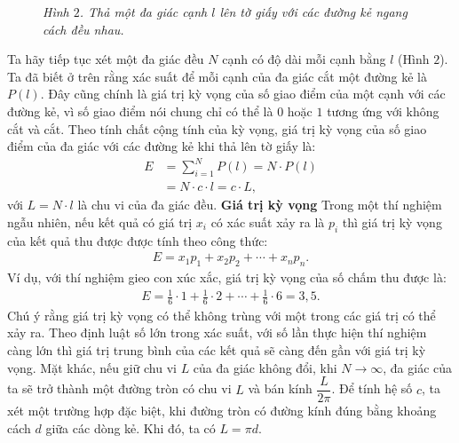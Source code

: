 \begin{multicols}{2}
\begin{figure}[H]
		\caption{\small\textit{\color{toanhocdoisong}Hình $2$. Thả một đa giác cạnh $l$ lên tờ giấy với các đường kẻ ngang cách đều nhau.}}
		\vspace*{-10pt}
	\end{figure}
	Ta hãy tiếp tục xét một đa giác đều $N$ cạnh có độ dài mỗi cạnh bằng $l$ (Hình $2$). Ta đã biết ở trên rằng xác suất để mỗi cạnh của đa giác cắt một đường kẻ là $P(l)$. Đây cũng chính là giá trị kỳ vọng của số giao điểm của một cạnh với các đường kẻ, vì số giao điểm nói chung chỉ có thể là $0$ hoặc $1$ tương ứng với không cắt và cắt. Theo tính chất cộng tính của kỳ vọng, giá trị kỳ vọng của số giao điểm của đa giác với các đường kẻ khi thả lên tờ giấy là:
	\begin{align*}
		E &= \sum\nolimits_{i = 1}^N {P(l) = N \cdot } P(l) \\
		&= N \cdot c \cdot l = c \cdot L, \tag{$1$}
	\end{align*}
	với $L=N \cdot l$ là chu vi của đa giác đều.
	\vskip 0.1cm
	\columnbreak
	\textbf{\color{toanhocdoisong}Giá trị kỳ vọng}
	\vskip 0.1cm
	Trong một thí nghiệm ngẫu nhiên, nếu kết quả có giá trị $x_i$ có xác suất xảy ra là $p_i$ thì giá trị kỳ vọng của kết quả thu được được tính theo công thức:
	\begin{align*}
		E=x_1 p_1+x_2 p_2+ \cdots +x_n p_n.
	\end{align*}
	Ví dụ, với thí nghiệm gieo con xúc xắc, giá trị kỳ vọng của số chấm thu được là:
	\begin{align*}
		E=\frac{1}{6}\cdot 1 + \frac{1}{6} \cdot 2 + \cdots + \frac{1}{6}\cdot6 = 3{,5}.
	\end{align*}
	Chú ý rằng giá trị kỳ vọng có thể không trùng với một trong các giá trị có thể xảy ra. Theo định luật số lớn trong xác suất, với số lần thực hiện thí nghiệm càng lớn thì giá trị trung bình của các kết quả sẽ càng đến gần với giá trị kỳ vọng.
	\vskip 0.1cm
	Mặt khác, nếu giữ chu vi $L$ của đa giác không đổi, khi $N \to \infty$, đa giác của ta sẽ trở thành một đường tròn có chu vi $L$ và bán kính $\dfrac{L}{2\pi}$.
	\vskip 0.1cm
	Để tính hệ số $c$, ta xét một trường hợp đặc biệt, khi đường tròn có đường kính đúng bằng khoảng cách $d$ giữa các dòng kẻ. Khi đó, ta có $L=\pi d$.

\end{multicols}
